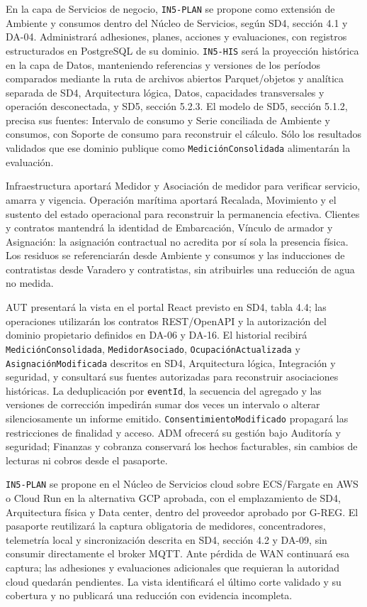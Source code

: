En la capa de Servicios de negocio, \texttt{IN5-PLAN} se propone
como extensión de Ambiente y consumos dentro del Núcleo de Servicios,
según SD4, sección 4.1 y DA-04. Administrará adhesiones, planes,
acciones y evaluaciones, con registros estructurados en PostgreSQL
de su dominio. \texttt{IN5-HIS} será la proyección histórica en la
capa de Datos, manteniendo referencias y versiones de los períodos
comparados mediante la ruta de archivos abiertos Parquet/objetos y analítica separada de SD4,
Arquitectura lógica, Datos, capacidades transversales y operación desconectada, y SD5, sección 5.2.3. El modelo de SD5, sección 5.1.2,
precisa sus fuentes: Intervalo de consumo y Serie conciliada de
Ambiente y consumos, con Soporte de consumo para reconstruir el
cálculo. Sólo los resultados validados que ese dominio publique
como \texttt{MediciónConsolidada} alimentarán la evaluación.

Infraestructura aportará Medidor y Asociación de medidor para
verificar servicio, amarra y vigencia. Operación marítima aportará
Recalada, Movimiento y el sustento del estado operacional para
reconstruir la permanencia efectiva. Clientes y contratos mantendrá
la identidad de Embarcación, Vínculo de armador y Asignación:
la asignación contractual no acredita por sí sola la presencia
física. Los residuos se referenciarán desde Ambiente y consumos
y las inducciones de contratistas desde Varadero y contratistas,
sin atribuirles una reducción de agua no medida.

AUT presentará la vista en el portal React previsto en SD4,
tabla 4.4; las operaciones utilizarán los contratos REST/OpenAPI
y la autorización del dominio propietario definidos en DA-06
y DA-16. El historial recibirá \texttt{MediciónConsolidada},
\texttt{MedidorAsociado}, \texttt{OcupaciónActualizada} y
\texttt{AsignaciónModificada} descritos en SD4, Arquitectura lógica, Integración y seguridad,
y consultará sus fuentes autorizadas para reconstruir asociaciones
históricas. La deduplicación por \texttt{eventId}, la secuencia
del agregado y las versiones de corrección impedirán sumar dos
veces un intervalo o alterar silenciosamente un informe emitido.
\texttt{ConsentimientoModificado} propagará las restricciones
de finalidad y acceso. ADM ofrecerá su gestión bajo Auditoría
y seguridad; Finanzas y cobranza conservará los hechos facturables,
sin cambios de lecturas ni cobros desde el pasaporte.

\texttt{IN5-PLAN} se propone en el Núcleo de Servicios cloud sobre
ECS/Fargate en AWS o Cloud Run en la alternativa GCP aprobada, con el emplazamiento de SD4, Arquitectura física y Data center, dentro del proveedor aprobado por G-REG. El pasaporte
reutilizará la captura obligatoria de medidores, concentradores,
telemetría local y sincronización descrita en SD4, sección 4.2
y DA-09, sin consumir directamente el broker MQTT. Ante pérdida
de WAN continuará esa captura; las adhesiones y evaluaciones
adicionales que requieran la autoridad cloud quedarán pendientes.
La vista identificará el último corte validado y su cobertura
y no publicará una reducción con evidencia incompleta.

